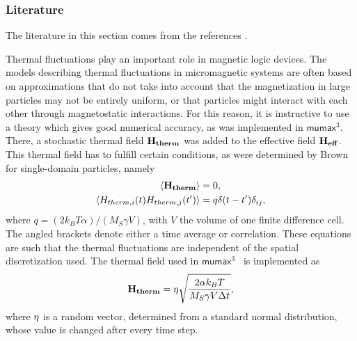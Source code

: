 \documentclass[10pt,a4paper]{article}
\newcommand{\mumax}{$\mathsf{mumax}^3$}
\begin{document}
\subsubsection{Literature}
The literature in this section comes from the references \cite{LEL-17b}. \par
Thermal fluctuations play an important role in magnetic logic devices. The models describing thermal fluctuations in micromagnetic systems are often based on approximations that do not take into account that the magnetization in large particles may not be entirely uniform, or that particles might interact with each other through magnetostatic interactions. For this reason, it is instructive to use a theory which gives good numerical accuracy, as was implemented in \mumax{}.~\cite{LEL-17b} There, a stochastic thermal field $\vb{H_{therm}}$ was added to the effective field $\vb{H_{eff}}$. This thermal field has to fulfill certain conditions, as were determined by Brown for single-domain particles, namely %
\begin{align*}
    \langle \vb{H_{therm}} \rangle &= 0 \mathrm{,} \\
    \langle H_{therm,i}(t) H_{therm,j}(t') \rangle &= q \delta(t-t') \delta_{ij} \mathrm{,}
\end{align*}
where $q=(2 k_B T \alpha)/(M_S \gamma V)$, with $V$ the volume of one finite difference cell. The angled brackets denote either a time average or correlation. These equations are such that the thermal fluctuations are independent of the spatial discretization used. The thermal field used in \mumax{}~\cite{LEL-17b,MuMax3,phd_leliaert} is implemented as
\begin{equation}
    \vb{H_{therm}} = \vb{\eta} \sqrt{\frac{2 \alpha k_B T}{M_S \gamma V \Delta t}} \mathrm{,}
\end{equation}
where $\vb{\eta}$ is a random vector, determined from a standard normal distribution, whose value is changed after every time step.
\end{document}
